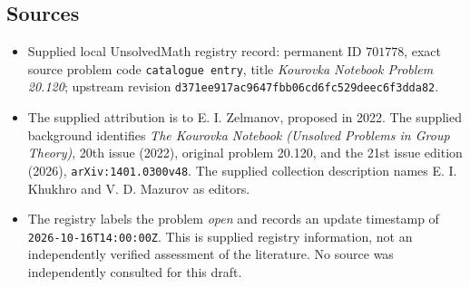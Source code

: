 \documentclass[11pt]{article}
\begin{document}
\subsection{Sources}
\begin{itemize}
\item Supplied local UnsolvedMath registry record: permanent ID \(701778\), exact source problem code \texttt{catalogue entry}, title \emph{Kourovka Notebook Problem 20.120}; upstream revision \texttt{d371ee917ac9647fbb06cd6fc529deec6f3dda82}.
\item The supplied attribution is to E. I. Zelmanov, proposed in 2022. The supplied background identifies \emph{The Kourovka Notebook (Unsolved Problems in Group Theory)}, 20th issue (2022), original problem 20.120, and the 21st issue edition (2026), \texttt{arXiv:1401.0300v48}. The supplied collection description names E. I. Khukhro and V. D. Mazurov as editors.
\item The registry labels the problem \emph{open} and records an update timestamp of \texttt{2026-10-16T14:00:00Z}. This is supplied registry information, not an independently verified assessment of the literature. No source was independently consulted for this draft.
\end{itemize}
\end{document}
